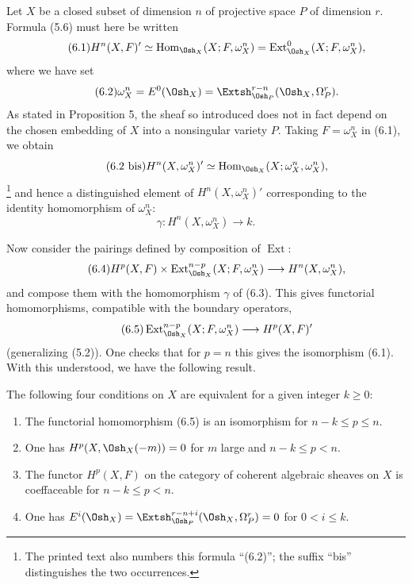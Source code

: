 
Let $X$ be a closed subset of dimension $n$ of projective space $P$ of
dimension $r$. Formula (5.6) must here be written
\begin{equation}\tag{6.1}
  H^{n}(X,F)'
  \simeq\operatorname{Hom}_{\Osh_X}(X;F,\omega_X^{n})
  =\operatorname{Ext}_{\Osh_X}^{0}(X;F,\omega_X^{n}),
\end{equation}
where we have set
\begin{equation}\tag{6.2}
  \omega_X^{n}=E^{0}(\Osh_X)
  =\Extsh_{\Osh_P}^{r-n}(\Osh_X,\Omega_P^{r}).
\end{equation}
As stated in Proposition 5, the sheaf so introduced does not in fact depend on
the chosen embedding of $X$ into a nonsingular variety $P$. Taking
$F=\omega_X^{n}$ in (6.1), we obtain
\begin{equation}\tag{6.2 bis}
  H^{n}(X,\omega_X^{n})'
  \simeq\operatorname{Hom}_{\Osh_X}(X;\omega_X^{n},\omega_X^{n}),
\end{equation}
\footnote{The printed text also numbers this formula ``(6.2)''; the suffix
``bis'' distinguishes the two occurrences.} and hence a distinguished element
of $H^{n}(X,\omega_X^{n})'$ corresponding to the identity homomorphism of
$\omega_X^{n}$:
\begin{equation}\tag{6.3}
  \gamma:H^{n}(X,\omega_X^{n})\longrightarrow k.
\end{equation}

Now consider the pairings defined by composition of $\operatorname{Ext}$:
\begin{equation}\tag{6.4}
  H^{p}(X,F)\times
  \operatorname{Ext}_{\Osh_X}^{n-p}(X;F,\omega_X^{n})
  \longrightarrow H^{n}(X,\omega_X^{n}),
\end{equation}
and compose them with the homomorphism $\gamma$ of (6.3). This gives functorial
homomorphisms, compatible with the boundary operators,
\begin{equation}\tag{6.5}
  \operatorname{Ext}_{\Osh_X}^{n-p}(X;F,\omega_X^{n})
  \longrightarrow H^{p}(X,F)'
\end{equation}
(generalizing (5.2)). One checks that for $p=n$ this gives the isomorphism
(6.1). With this understood, we have the following result.

 The following four conditions on $X$ are equivalent for
a given integer $k\geq0$:
\begin{enumerate}
  \item[\textit{i.}] The functorial homomorphism (6.5) is an isomorphism for
    $n-k\leq p\leq n$.
  \item[\textit{ii.}] One has $H^{p}(X,\Osh_X(-m))=0$ for $m$ large and
    $n-k\leq p<n$.
  \item[\textit{iii.}] The functor $H^{p}(X,F)$ on the category of coherent
    algebraic sheaves on $X$ is coeffaceable for $n-k\leq p<n$.
  \item[\textit{iv.}] One has
    $E^{i}(\Osh_X)=\Extsh_{\Osh_P}^{r-n+i}(\Osh_X,\Omega_P^{r})=0$
    for $0<i\leq k$.
\end{enumerate}

